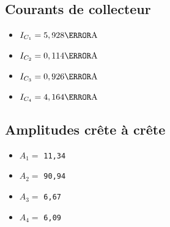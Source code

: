    \subsection{Courants de collecteur}
    \begin{itemize}
     \item $I_{C_1} = 5,928 \milli\ampere$
     \item $I_{C_2} = 0,114 \milli\ampere$
     \item $I_{C_3} = 0,926 \milli\ampere$
     \item $I_{C_4} = 4,164 \milli\ampere$
    \end{itemize}

   \subsection{Amplitudes crête à crête}
    \begin{itemize}
     \item $A_1 =$ \verb|11,34| \milli\volt
     \item $A_2 =$ \verb|90,94| \milli\volt
     \item $A_3 =$ \verb|6,67| \volt
     \item $A_4 =$ \verb|6,09| \volt
    \end{itemize}
